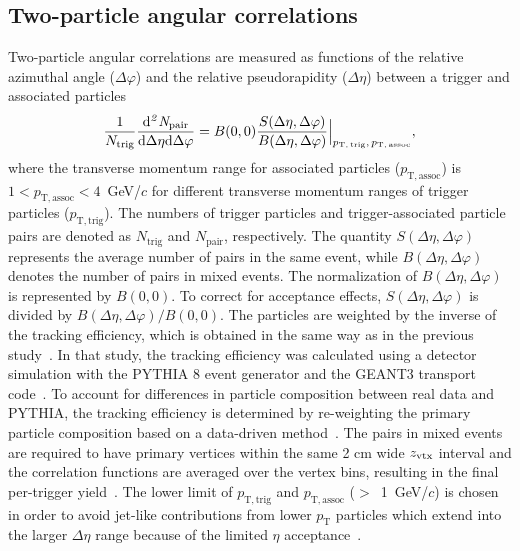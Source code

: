 \subsection{Two-particle angular correlations}
Two-particle angular correlations are measured as functions of the relative azimuthal angle ($\Delta\varphi$) and the relative pseudorapidity ($\Delta\eta$) between a trigger and associated particles
\begin{eqnarray}
\frac{1}{N_{\rm{trig}}} \frac{ \rm{d}\it{}^{2} N_{\rm{pair}} }{ \rm{d} \Delta\eta \rm{d}\Delta\varphi} = B(0, 0)\frac{S(\Delta\eta, \Delta\varphi)}{B(\Delta\eta, \Delta\varphi)}  \Big\lvert_{p_\mathrm{T,\,trig},\,p_\mathrm{T,\,assoc}},
\label{eq:corrfunction}
\end{eqnarray}
where the transverse momentum range for associated particles ($p_\mathrm{T,assoc}$) is $1<p_\mathrm{T,assoc}<4$~GeV/$c$ for different transverse momentum ranges of trigger particles ($p_\mathrm{T,trig}$).
The numbers of trigger particles and trigger-associated particle pairs are denoted as $N_\mathrm{trig}$ and $N_\mathrm{pair}$, respectively.
The quantity $S(\Delta\eta, \Delta\varphi)$ represents the average number of pairs in the same event, while $B(\Delta\eta, \Delta\varphi)$ denotes the number of pairs in mixed events. The normalization of $B(\Delta\eta, \Delta\varphi)$ is represented by $B(0,0)$. To correct for acceptance effects, $S(\Delta\eta, \Delta\varphi)$ is divided by $B(\Delta\eta, \Delta\varphi)/B(0,0)$. The particles are weighted by the inverse of the tracking efficiency, which is obtained in the same way as in the previous study~\cite{ALICE:2021nir}. In that study, the tracking efficiency was calculated using a detector simulation with the PYTHIA 8 event generator and the GEANT3 transport code~\cite{Brun:1994aa}. To account for differences in particle composition between real data and PYTHIA, the tracking efficiency is determined by re-weighting the primary particle composition based on a data-driven method~\cite{ALICE:2018hza, ALICE:2018vuu}.
The pairs in mixed events are required to have primary vertices within the same 2 cm wide $z_{\rm vtx}$ interval and the correlation functions are averaged over the vertex bins, resulting in the final per-trigger yield~\cite{KOPYLOV1974472:evtmixing,Adam:2016tsv}. The lower limit of $p_\mathrm{T,trig}$ and $p_\mathrm{T,assoc}$ ($>$~1~GeV/$c$) is chosen in order to avoid jet-like contributions from lower $p_\mathrm{T}$ particles which extend into the larger $\Delta\eta$ range because of the limited $\eta$ acceptance~\cite{ALICE:2021nir}. 

